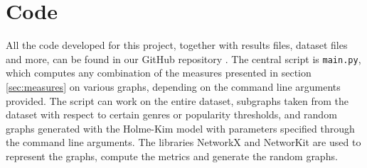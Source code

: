 \section{Code}

All the code developed for this project, together with results files, dataset files and more, can be found in our GitHub repository \cite{githubRepo}. The central script is \texttt{main.py}, which computes any combination of the measures presented in section \ref{sec:measures} on various graphs, depending on the command line arguments provided. The script can work on the entire dataset, subgraphs taken from the dataset with respect to certain genres or popularity thresholds, and random graphs generated with the Holme-Kim model \cite{Holme2002} with parameters specified through the command line arguments. The libraries NetworkX \cite{networkx} and NetworKit \cite{networkit} are used to represent the graphs, compute the metrics and generate the random graphs.
